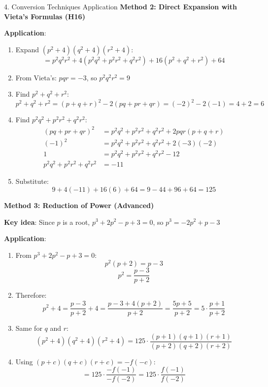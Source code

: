 \documentclass[12pt]{article}
\begin{document}
\begin{conversionbox}{4. Conversion Techniques Application}
\textbf{Method 2: Direct Expansion with Vieta's Formulas (H16)}

\textbf{Application}:
\begin{enumerate}
    \item Expand $(p^2 + 4)(q^2 + 4)(r^2 + 4)$:
    \[= p^2q^2r^2 + 4(p^2q^2 + p^2r^2 + q^2r^2) + 16(p^2 + q^2 + r^2) + 64\]
    
    \item From Vieta's: $pqr = -3$, so $p^2q^2r^2 = 9$
    
    \item Find $p^2 + q^2 + r^2$:
    \[p^2 + q^2 + r^2 = (p + q + r)^2 - 2(pq + pr + qr) = (-2)^2 - 2(-1) = 4 + 2 = 6\]
    
    \item Find $p^2q^2 + p^2r^2 + q^2r^2$:
    \begin{align*}
    (pq + pr + qr)^2 &= p^2q^2 + p^2r^2 + q^2r^2 + 2pqr(p + q + r)\\
    (-1)^2 &= p^2q^2 + p^2r^2 + q^2r^2 + 2(-3)(-2)\\
    1 &= p^2q^2 + p^2r^2 + q^2r^2 - 12\\
    p^2q^2 + p^2r^2 + q^2r^2 &= -11
    \end{align*}
    
    \item Substitute:
    \[9 + 4(-11) + 16(6) + 64 = 9 - 44 + 96 + 64 = 125\]
\end{enumerate}

\textbf{Method 3: Reduction of Power (Advanced)}

\textbf{Key idea}: Since $p$ is a root, $p^3 + 2p^2 - p + 3 = 0$, so $p^3 = -2p^2 + p - 3$

\textbf{Application}:
\begin{enumerate}
    \item From $p^3 + 2p^2 - p + 3 = 0$:
    \[p^2(p + 2) = p - 3\]
    \[p^2 = \frac{p - 3}{p + 2}\]
    
    \item Therefore:
    \[p^2 + 4 = \frac{p - 3}{p + 2} + 4 = \frac{p - 3 + 4(p + 2)}{p + 2} = \frac{5p + 5}{p + 2} = 5 \cdot \frac{p + 1}{p + 2}\]
    
    \item Same for $q$ and $r$:
    \[(p^2 + 4)(q^2 + 4)(r^2 + 4) = 125 \cdot \frac{(p + 1)(q + 1)(r + 1)}{(p + 2)(q + 2)(r + 2)}\]
    
    \item Using $(p + c)(q + c)(r + c) = -f(-c)$:
    \[= 125 \cdot \frac{-f(-1)}{-f(-2)} = 125 \cdot \frac{f(-1)}{f(-2)}\]
    

\end{enumerate}
\end{conversionbox}
\end{document}
